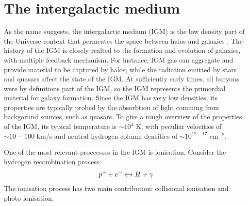 \section{The intergalactic medium}
As the name suggests, the intergalactic medium (IGM) is the low density part of the Universe content that permeates the space between halos and galaxies \cite{Mo2010}. The history of the IGM is closely realted to the formation and evolution of galaxies, with multiple feedback mechanism. For instance, IGM gas can aggregate and provide material to be captured by halos, while the radiation emitted by stars and quasars affect the state of the IGM. At sufficiently early times, all baryons were by definitions part of the IGM, so the IGM represents the primordial material for galaxy formation. Since the IGM has very low densities, its properties are typically probed by the absorbtion of light comming from backgorund sources, such as quasars. To give a rough overview of the properties of the IGM, its typical temperature is $\sim 10^4$ K, with peculiar velocities of $\sim 10-100$ km/s and neutral hydrogen column densities of $\sim 10^{12-17}$ cm$^{-2}$.

One of the most relevant proccesses in the IGM is ionisation. Consider the hydrogen recombination process:
$$p^+ + e^- \xleftrightarrow \ H +\gamma$$
The ionisation process has two main contribution: collisional ionisation and photo-ionisation.

